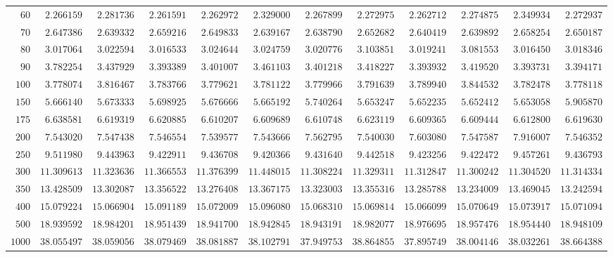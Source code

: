 \begin{sidewaystable}
\begin{tabular}{r|rrrrrrrrrrr}
$60$ & $2.266159$ & $2.281736$ & $2.261591$ & $2.262972$ & $2.329000$ & $2.267899$ & $2.272975$ & $2.262712$ & $2.274875$ & $2.349934$ & $2.272937$ \\
$70$ & $2.647386$ & $2.639332$ & $2.659216$ & $2.649833$ & $2.639167$ & $2.638790$ & $2.652682$ & $2.640419$ & $2.639892$ & $2.658254$ & $2.650187$ \\
$80$ & $3.017064$ & $3.022594$ & $3.016533$ & $3.024644$ & $3.024759$ & $3.020776$ & $3.103851$ & $3.019241$ & $3.081553$ & $3.016450$ & $3.018346$ \\
$90$ & $3.782254$ & $3.437929$ & $3.393389$ & $3.401007$ & $3.461103$ & $3.401218$ & $3.418227$ & $3.393932$ & $3.419520$ & $3.393731$ & $3.394171$ \\
$100$ & $3.778074$ & $3.816467$ & $3.783766$ & $3.779621$ & $3.781122$ & $3.779966$ & $3.791639$ & $3.789940$ & $3.844532$ & $3.782478$ & $3.778118$ \\
$150$ & $5.666140$ & $5.673333$ & $5.698925$ & $5.676666$ & $5.665192$ & $5.740264$ & $5.653247$ & $5.652235$ & $5.652412$ & $5.653058$ & $5.905870$ \\
$175$ & $6.638581$ & $6.619319$ & $6.620885$ & $6.610207$ & $6.609689$ & $6.610748$ & $6.623119$ & $6.609365$ & $6.609444$ & $6.612800$ & $6.619630$ \\
$200$ & $7.543020$ & $7.547438$ & $7.546554$ & $7.539577$ & $7.543666$ & $7.562795$ & $7.540030$ & $7.603080$ & $7.547587$ & $7.916007$ & $7.546352$ \\
$250$ & $9.511980$ & $9.443963$ & $9.422911$ & $9.436708$ & $9.420366$ & $9.431640$ & $9.442518$ & $9.423256$ & $9.422472$ & $9.457261$ & $9.436793$ \\
$300$ & $11.309613$ & $11.323636$ & $11.366553$ & $11.376399$ & $11.448015$ & $11.308224$ & $11.329311$ & $11.312847$ & $11.300242$ & $11.304520$ & $11.314334$ \\
$350$ & $13.428509$ & $13.302087$ & $13.356522$ & $13.276408$ & $13.367175$ & $13.323003$ & $13.355316$ & $13.285788$ & $13.234009$ & $13.469045$ & $13.242594$ \\
$400$ & $15.079224$ & $15.066904$ & $15.091189$ & $15.072009$ & $15.096080$ & $15.068310$ & $15.069814$ & $15.066099$ & $15.070649$ & $15.073917$ & $15.071094$ \\
$500$ & $18.939592$ & $18.984201$ & $18.951439$ & $18.941700$ & $18.942845$ & $18.943191$ & $18.982077$ & $18.976695$ & $18.957476$ & $18.954440$ & $18.948109$ \\
$1000$ & $38.055497$ & $38.059056$ & $38.079469$ & $38.081887$ & $38.102791$ & $37.949753$ & $38.864855$ & $37.895749$ & $38.004146$ & $38.032261$ & $38.664388$ \\
\hline
\end{tabular}
\end{sidewaystable}
 
